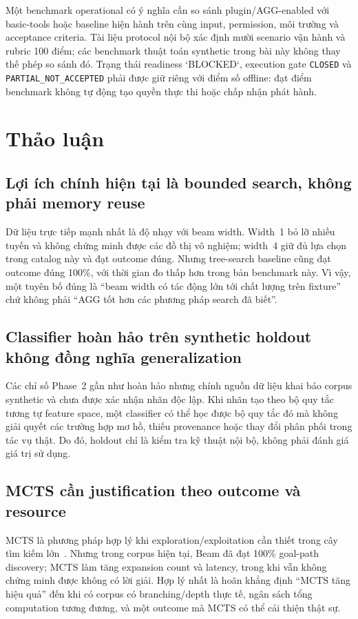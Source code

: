 \documentclass[11pt,a4paper]{article}
\newcommand{\code}[1]{\texttt{\small #1}}
\begin{document}
Một benchmark operational có ý nghĩa cần so sánh plugin/AGG-enabled với basic-tools hoặc baseline hiện hành trên cùng input, permission, môi trường và acceptance criteria. Tài liệu protocol nội bộ xác định mười scenario vận hành và rubric 100 điểm; các benchmark thuật toán synthetic trong bài này không thay thế phép so sánh đó. Trạng thái readiness `BLOCKED`, execution gate \code{CLOSED} và \code{PARTIAL\_NOT\_ACCEPTED} phải được giữ riêng với điểm số offline: đạt điểm benchmark không tự động tạo quyền thực thi hoặc chấp nhận phát hành.

\section{Thảo luận}

\subsection{Lợi ích chính hiện tại là bounded search, không phải memory reuse}
Dữ liệu trực tiếp mạnh nhất là độ nhạy với beam width. Width~1 bỏ lỡ nhiều tuyến và không chứng minh được các đồ thị vô nghiệm; width~4 giữ đủ lựa chọn trong catalog này và đạt outcome đúng. Nhưng tree-search baseline cũng đạt outcome đúng 100\%, với thời gian đo thấp hơn trong bản benchmark này. Vì vậy, một tuyên bố đúng là “beam width có tác động lớn tới chất lượng trên fixture” chứ không phải “AGG tốt hơn các phương pháp search đã biết”.

\subsection{Classifier hoàn hảo trên synthetic holdout không đồng nghĩa generalization}
Các chỉ số Phase~2 gần như hoàn hảo nhưng chính nguồn dữ liệu khai báo corpus synthetic và chưa được xác nhận nhãn độc lập. Khi nhãn tạo theo bộ quy tắc tương tự feature space, một classifier có thể học được bộ quy tắc đó mà không giải quyết các trường hợp mơ hồ, thiếu provenance hoặc thay đổi phân phối trong tác vụ thật. Do đó, holdout chỉ là kiểm tra kỹ thuật nội bộ, không phải đánh giá giá trị sử dụng.

\subsection{MCTS cần justification theo outcome và resource}
MCTS là phương pháp hợp lý khi exploration/exploitation cần thiết trong cây tìm kiếm lớn \,\cite{kocsis2006uct}. Nhưng trong corpus hiện tại, Beam đã đạt 100\% goal-path discovery; MCTS làm tăng expansion count và latency, trong khi vẫn không chứng minh được không có lời giải. Hợp lý nhất là hoãn khẳng định “MCTS tăng hiệu quả” đến khi có corpus có branching/depth thực tế, ngân sách tổng computation tương đương, và một outcome mà MCTS có thể cải thiện thật sự.
\end{document}
